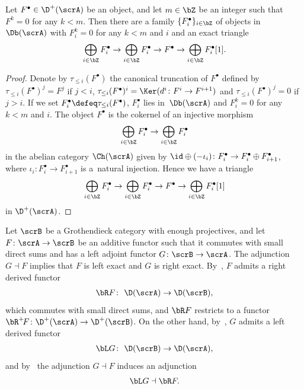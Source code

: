 \begin{lem}\label{canonical truncation}
Let $F^{\bullet}\in \D^+(\scrA)$ be an object, and let $m\in \bZ$ be an integer such that $F^k=0$ for any $k<m$. Then there are a family $\{F^{\bullet}_i\}_{i\in \bZ}$ of objects in $\Db(\scrA)$ with $F^{k}_i=0$ for any $k<m$ and $i$ and an exact triangle
\begin{gather*}
\bigoplus_{i\in \bZ}F^{\bullet}_i\to \bigoplus_{i\in \bZ}F^{\bullet}_i\to F^{\bullet}\to \bigoplus_{i\in \bZ}F^{\bullet}_i[1].
\end{gather*}
\begin{proof}
Denote by $\tau_{\leq i}(F^{\bullet})$ the canonical truncation of $F^{\bullet}$ defined by $\tau_{\leq i}(F^{\bullet})^j=F^j$ if $j<i$, $\tau_{\leq i}(F^{\bullet})^i=\Ker(d^i\colon F^i\to F^{i+1})$ and $\tau_{\leq i}(F^{\bullet})^j=0$ if $j>i$. If we set $F_i^{\bullet}\defeq \tau_{\leq i}(F^{\bullet})$, $F_i^{\bullet}$ lies in~$\Db(\scrA)$ and $F^{k}_i=0$ for any $k<m$ and $i$. The object $F^{\bullet}$ is the cokernel of an injective morphism
\begin{gather*}
\bigoplus_{i\in \bZ} F^{\bullet}_i\to \bigoplus_{i\in \bZ} F^{\bullet}_i
\end{gather*}
in the abelian category $\Ch(\scrA)$ given by
 $\id \oplus (-\iota_i)\colon F^{\bullet}_i\to F^{\bullet}_i\oplus F^{\bullet}_{i+1}$, where $\iota_i\colon F^{\bullet}_i\to F^{\bullet}_{i+1}$ is a~natural injection. Hence we have a triangle
\begin{gather*}
\bigoplus_{i\in \bZ}F^{\bullet}_i\to \bigoplus_{i\in \bZ}F^{\bullet}_i\to F^{\bullet}\to \bigoplus_{i\in \bZ}F^{\bullet}_i[1]
\end{gather*}
in $\D^+(\scrA)$.
\end{proof}
\end{lem}

Let $\scrB$ be a Grothendieck category with enough projectives, and let $F\colon \scrA\to\scrB$ be an addi\-tive functor such that it commutes with small direct sums and has a left adjoint functor $G\colon \scrB\to \scrA$. The adjunction $G\dashv F$ implies that $F$ is left exact and $G$ is right exact. By~\cite[Proposition~14.3.4]{ks2}, $F$ admits a right derived functor
 \begin{gather*}
 \bR F\colon\ \D(\scrA)\to \D(\scrB),
 \end{gather*}
 which commutes with small direct sums, and $ \bR F$ restricts to a functor $\bR^+\!F\colon \D^+(\scrA)\to \D^+(\scrB)$. On the other hand, by~\cite[Theorem~14.4.3]{ks2}, $G$ admits a left derived functor
 \begin{gather*}
 \bL G\colon\ \D(\scrB)\to \D(\scrA),
 \end{gather*}
 and by~\cite[Theorem~14.4.5]{ks2} the adjunction $G\dashv F$ induces an adjunction
 \begin{gather*}
 \bL G\dashv \bR F.
 \end{gather*}

